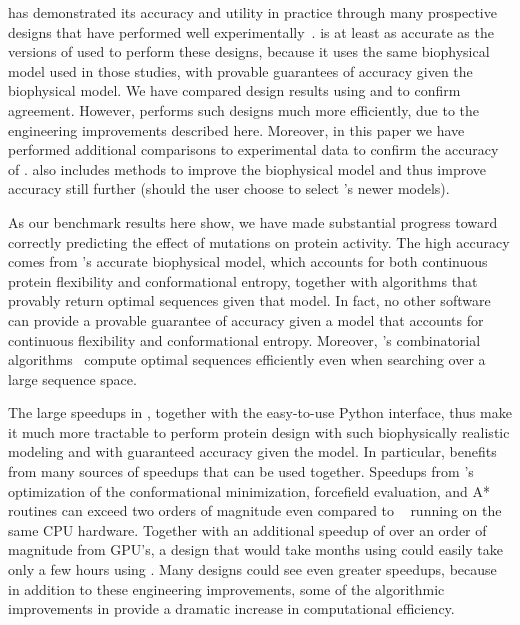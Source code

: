 \osprey has demonstrated its accuracy and utility in practice through many prospective designs that have performed well experimentally~\cite{VRC07_enhance,CFTR,runx1_cbfb,GrsA-LeuA,DHFR-PNAS,GrsA-TyrA,specific_probes}.   is at least as accurate as the versions of \osprey used to perform these designs, because it uses the same biophysical model used in those studies, with provable guarantees of accuracy given the biophysical model.  We have compared design results using  and  to confirm agreement.  However,  performs such designs much more efficiently, due to the engineering improvements described here.  Moreover, in this paper we have performed additional comparisons to experimental data to confirm the accuracy of .   also includes methods to improve the biophysical model and thus improve accuracy still further (should the user choose to select \osprey's newer models). 

As our benchmark results here show, we have made substantial progress toward correctly predicting the effect of mutations on protein activity.  The high accuracy comes from \osprey's accurate biophysical model, which accounts for both continuous protein flexibility and conformational entropy, together with algorithms that provably return optimal sequences given that model.  In fact, no other software can provide a provable guarantee of accuracy given a model that accounts for continuous flexibility and conformational entropy.  Moreover, \osprey's combinatorial algorithms~\cite{alg_SMB_textbook,cosb_design} compute optimal sequences efficiently even when searching over a large sequence space.  

The large speedups in , together with the easy-to-use Python interface, thus make it much more tractable to perform protein design with such biophysically realistic modeling and with guaranteed accuracy given the model.  In particular,  benefits from many sources of speedups that can be used together.  Speedups from 's optimization of the conformational minimization, forcefield evaluation, and A* routines can exceed two orders of magnitude even compared to ~\cite{COMETS} running on the same CPU hardware.  Together with an additional speedup of over an order of magnitude from GPU's, a design that would take months using  could easily take only a few hours using .  Many designs could see even greater speedups, because in addition to these engineering improvements, some of the algorithmic improvements in  provide a dramatic increase in computational efficiency.  

